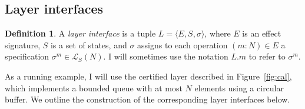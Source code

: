 \documentclass[11pt,oneside]{book}
\theoremstyle{definition}
\newtheorem{definition}[theorem]{Definition}
\begin{document}

\subsection{Layer interfaces} %

\begin{definition} %
A \emph{layer interface} is a tuple
$L = \langle E, S, \sigma \rangle$,
where $E$ is an effect signature,
$S$ is a set of states,
and $\sigma$ assigns to each operation
$(m \mathbin: N) \in E$
a specification
$\sigma^m \in \mathcal{L}_S(N)$.
I will sometimes use the notation $L.m$
to refer to $\sigma^m$.
\end{definition}

As a running example,
I will use the certified layer
described in Figure~\ref{fig:cal},
which implements a bounded queue with at most $N$ elements
using a circular buffer.
We outline the construction of
the corresponding layer interfaces below.
\end{document}
